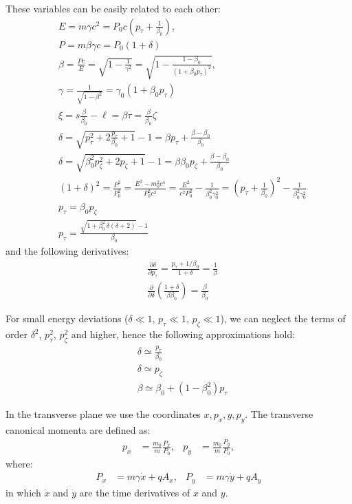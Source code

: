 These variables can be easily related to each other:
\begin{align}
  &E =  m \gamma c^2 = P_0 c \left( p_\tau + \frac{1}{\beta_0}\right), \\
  &P = m \beta \gamma c = P_0 (1 + \delta) \\
  &\beta = \frac{P c}{E} = \sqrt{1-\frac{1}{\gamma^2}} =\sqrt{1 - \frac{1 - \beta_0}{\left(1 + \beta_0 p_\tau\right)^2}}, \\
  &\gamma = \frac{1}{\sqrt{1-\beta^2}} = \gamma_0 (1 + \beta_0 p_\tau)\\
  &\xi= s \frac{\beta}{\beta_0} - \ell =
      \beta\tau =
      \frac{\beta}{\beta_0}\zeta \\
  &\delta= \sqrt{p_\tau^2 + 2 \frac{p_\tau}{\beta_0} +1} - 1
       =\beta p_\tau + \frac{\beta-\beta_0}{\beta_0}\\
  &\delta= \sqrt{\beta_0^2p_\zeta^2 + 2 p_\zeta +1} - 1
      =\beta\beta_0 p_\zeta + \frac{\beta-\beta_0}{\beta_0}\\
  &(1+\delta)^2 = \frac{P^2}{P_0^2} = \frac{E^2 - m_0^2 c^4}{P_0^2 c^2}
     = \frac{E^2}{c^2 P_0^2} - \frac{1}{\beta_0^2 \gamma_0^2}
     = \left( p_\tau + \frac{1}{\beta_0}\right)^2 - \frac{1}{\beta_0^2 \gamma_0^2}
     \label{eq:one_plus_delta_squared}\\
  &p_\tau = \beta_0 p_\zeta\\
  &p_\tau = \frac{\sqrt{1 + \beta_0^2\,\delta(\delta + 2)} - 1}{\beta_0}
\end{align}
and the following derivatives:
\begin{align}
    &\frac{\partial \delta}{\partial p_\tau} =
    \frac{p_\tau+1/\beta_0}{1+\delta} = \frac{1}{\beta} \\
  &\frac{\partial}{\partial\delta}\left(
    \frac{1+\delta}{\beta\beta_0}
  \right)=
    \frac{\beta}{\beta_0}
\end{align}

For small energy deviations ($\delta \ll 1$, $p_\tau \ll 1$, $p_\zeta \ll 1$),
we can neglect the terms of order $\delta^2$, $p_\tau^2$, $p_\zeta^2$ and higher, hence
the following approximations hold:
\begin{align}
  &\delta \simeq \frac{p_\tau}{\beta_0} \\
  &\delta \simeq p_\zeta \label{eq:delta_pzeta_approx}\\
  &\beta \simeq \beta_0 + (1 - \beta_0^2) p_\tau
\end{align}

In the transverse plane we use the coordinates $x, p_x, y, p_y$. The transverse canonical
momenta are defined as:
\begin{align}
  p_x&= \frac{m_0}{m}\frac{P_x}{P_0}, &
  p_y&= \frac{m_0}{m}\frac{P_y}{P_0},
\end{align}
where:
\begin{align}
  P_x &= m \gamma \dot x + q A_x, &
  P_y &= m \gamma \dot y + q A_y
\end{align}
in which $\dot x$ and $\dot y$ are the time derivatives of $x$ and $y$.

